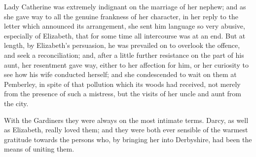 Lady Catherine was extremely indignant on the marriage of her nephew; and as she gave way to all the genuine frankness of her character, in her reply to the letter which announced its arrangement, she sent him language so very abusive, especially of Elizabeth, that for some time all intercourse was at an end. But at length, by Elizabeth's persuasion, he was prevailed on to overlook the offence, and seek a reconciliation; and, after a little further resistance on the part of his aunt, her resentment gave way, either to her affection for him, or her curiosity to see how his wife conducted herself; and she condescended to wait on them at Pemberley, in spite of that pollution which its woods had received, not merely from the presence of such a mistress, but the visits of her uncle and aunt from the city.

With the Gardiners they were always on the most intimate terms. Darcy, as well as Elizabeth, really loved them; and they were both ever sensible of the warmest gratitude towards the persons who, by bringing her into Derbyshire, had been the means of uniting them.




